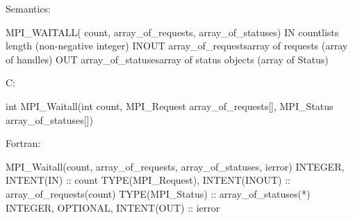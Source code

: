 Semantics:

MPI_WAITALL( count, array_of_requests, array_of_statuses)
IN countlists length (non-negative integer)
INOUT array_of_requestsarray of requests (array of handles)
OUT array_of_statusesarray of status objects (array of Status)

C:

int MPI_Waitall(int count, MPI_Request array_of_requests[], MPI_Status array_of_statuses[])

Fortran:

MPI_Waitall(count, array_of_requests, array_of_statuses, ierror)
INTEGER, INTENT(IN) :: count
TYPE(MPI_Request), INTENT(INOUT) :: array_of_requests(count)
TYPE(MPI_Status) :: array_of_statuses(*)
INTEGER, OPTIONAL, INTENT(OUT) :: ierror
